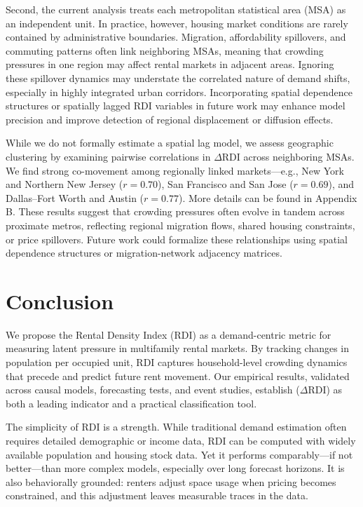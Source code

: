 \documentclass[APA,Times1COL]{WileyNJDv5} %
\begin{document}
Second, the current analysis treats each metropolitan statistical area (MSA) as an independent unit. In practice, however, housing market conditions are rarely contained by administrative boundaries. Migration, affordability spillovers, and commuting patterns often link neighboring MSAs, meaning that crowding pressures in one region may affect rental markets in adjacent areas. Ignoring these spillover dynamics may understate the correlated nature of demand shifts, especially in highly integrated urban corridors. Incorporating spatial dependence structures or spatially lagged RDI variables in future work may enhance model precision and improve detection of regional displacement or diffusion effects.

While we do not formally estimate a spatial lag model, we assess geographic clustering by examining pairwise correlations in $\Delta \text{RDI}$ across neighboring MSAs. We find strong co-movement among regionally linked markets—e.g., New York and Northern New Jersey ($r = 0.70$), San Francisco and San Jose ($r = 0.69$), and Dallas–Fort Worth and Austin ($r = 0.77$). More details can be found in Appendix B. These results suggest that crowding pressures often evolve in tandem across proximate metros, reflecting regional migration flows, shared housing constraints, or price spillovers. Future work could formalize these relationships using spatial dependence structures or migration-network adjacency matrices.

\section{Conclusion}

We propose the Rental Density Index (RDI) as a demand-centric metric for measuring latent pressure in multifamily rental markets. By tracking changes in population per occupied unit, RDI captures household-level crowding dynamics that precede and predict future rent movement. Our empirical results, validated across causal models, forecasting tests, and event studies, establish (\(\Delta\text{RDI}\)) as both a leading indicator and a practical classification tool.

The simplicity of RDI is a strength. While traditional demand estimation often requires detailed demographic or income data, RDI can be computed with widely available population and housing stock data. Yet it performs comparably—if not better—than more complex models, especially over long forecast horizons. It is also behaviorally grounded: renters adjust space usage when pricing becomes constrained, and this adjustment leaves measurable traces in the data.
\end{document}
